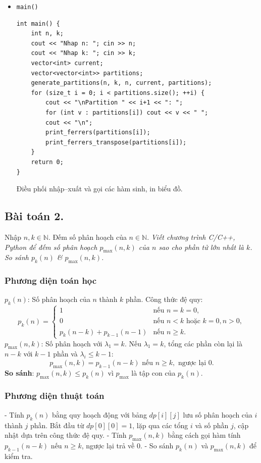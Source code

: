 \documentclass[a4paper,12pt]{article}
\begin{document}
\begin{itemize}
  \item \texttt{main()}  
    \begin{lstlisting}[style=cppstyle]
int main() {
    int n, k;
    cout << "Nhap n: "; cin >> n;
    cout << "Nhap k: "; cin >> k;
    vector<int> current;
    vector<vector<int>> partitions;
    generate_partitions(n, k, n, current, partitions);
    for (size_t i = 0; i < partitions.size(); ++i) {
        cout << "\nPartition " << i+1 << ": ";
        for (int v : partitions[i]) cout << v << " ";
        cout << "\n";
        print_ferrers(partitions[i]);
        print_ferrers_transpose(partitions[i]);
    }
    return 0;
}
    \end{lstlisting}
    Điều phối nhập–xuất và gọi các hàm sinh, in biểu đồ.
    
\end{itemize}

\subsection{Bài toán 2.} Nhập $n, k \in \mathbb{N}$. Đếm số phân hoạch của $n \in \mathbb{N}$. 
\textit{Viết chương trình C/C++, Python để đếm số phân hoạch $p_{\max}(n,k)$ của $n$ sao cho phần tử lớn nhất là $k$. So sánh $p_k(n)$ \& $p_{\max}(n,k)$.}

\subsubsection {Phương diện toán học}
\textbf{\( p_k(n) \)}: Số phân hoạch của \( n \) thành \( k \) phần. Công thức đệ quy:
  \[
  p_k(n) = 
  \begin{cases} 
  1 & \text{nếu } n = k = 0, \\
  0 & \text{nếu } n < k \text{ hoặc } k = 0, n > 0, \\
  p_k(n - k) + p_{k-1}(n - 1) & \text{nếu } n \geq k.
  \end{cases}
  \]
\textbf{\( p_{\max}(n,k) \)}: Số phân hoạch với \( \lambda_1 = k \). Nếu \( \lambda_1 = k \), tổng các phần còn lại là \( n - k \) với \( k - 1 \) phần và \( \lambda_i \leq k - 1 \):
  \[
  p_{\max}(n,k) = p_{k-1}(n - k) \text{ nếu } n \geq k, \text{ ngược lại } 0.
  \]
\textbf{So sánh}: \( p_{\max}(n,k) \leq p_k(n) \) vì \( p_{\max} \) là tập con của \( p_k(n) \).

\subsubsection {Phương diện thuật toán}
- Tính \( p_k(n) \) bằng quy hoạch động với bảng \( dp[i][j] \) lưu số phân hoạch của \( i \) thành \( j \) phần. Bắt đầu từ \( dp[0][0] = 1 \), lặp qua các tổng \( i \) và số phần \( j \), cập nhật dựa trên công thức đệ quy.
- Tính \( p_{\max}(n,k) \) bằng cách gọi hàm tính \( p_{k-1}(n - k) \) nếu \( n \geq k \), ngược lại trả về 0.
- So sánh \( p_k(n) \) và \( p_{\max}(n,k) \) để kiểm tra.
\end{document}
